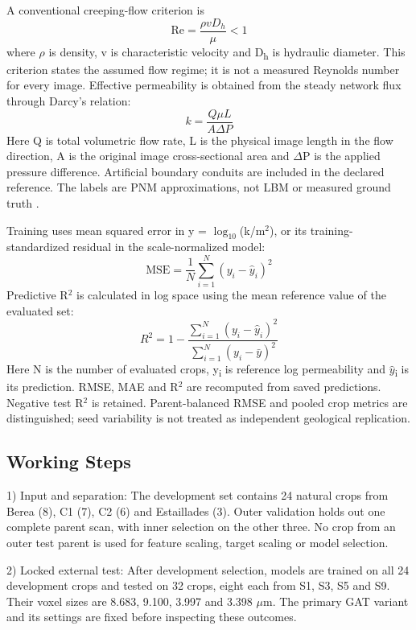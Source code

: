 \documentclass[a4paper]{svproc}
\begin{document}
A conventional creeping-flow criterion is
\[
\mathrm{Re}=\frac{\rho v{D}_{h}}{\mu }<1
\]
where \ensuremath{\rho} is density, v is characteristic velocity and D\textsubscript{h} is hydraulic diameter. This criterion states the assumed flow regime; it is not a measured Reynolds number for every image. Effective permeability is obtained from the steady network flux through Darcy's relation:
\[
k=\frac{Q\mu L}{A\Delta P}
\]
Here Q is total volumetric flow rate, L is the physical image length in the flow direction, A is the original image cross-sectional area and \ensuremath{\Delta}P is the applied pressure difference. Artificial boundary conduits are included in the declared reference. The labels are PNM approximations, not LBM or measured ground truth \cite{r2}.

Training uses mean squared error in y = \ensuremath{\log_{10}}(k/m\ensuremath{^{2}}), or its training-standardized residual in the scale-normalized model:
\[
\mathrm{MSE}=\frac{1}{N}\sum_{i=1}^{N} {\left( {y}_{i}-{\hat{y} }_{i}\right)}^{2}
\]
Predictive R\ensuremath{^{2}} is calculated in log space using the mean reference value of the evaluated set:
\[
{R}^{2}=1-\frac{\sum_{i=1}^{N} {\left( {y}_{i}-{\hat{y} }_{i}\right)}^{2}}{\sum_{i=1}^{N} {\left( {y}_{i}-\bar{y} \right)}^{2}}
\]
Here N is the number of evaluated crops, y\textsubscript{i} is reference log permeability and \ensuremath{\hat{y}}\textsubscript{i} is its prediction. RMSE, MAE and R\ensuremath{^{2}} are recomputed from saved predictions. Negative test R\ensuremath{^{2}} is retained. Parent-balanced RMSE and pooled crop metrics are distinguished; seed variability is not treated as independent geological replication.

\subsection{Working Steps}

1) Input and separation: The development set contains 24 natural crops from Berea (8), C1 (7), C2 (6) and Estaillades (3). Outer validation holds out one complete parent scan, with inner selection on the other three. No crop from an outer test parent is used for feature scaling, target scaling or model selection.

2) Locked external test: After development selection, models are trained on all 24 development crops and tested on 32 crops, eight each from S1, S3, S5 and S9. Their voxel sizes are 8.683, 9.100, 3.997 and 3.398 \ensuremath{\mu}m. The primary GAT variant and its settings are fixed before inspecting these outcomes.
\end{document}
